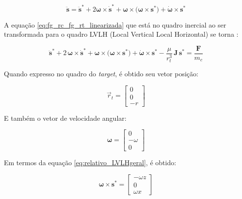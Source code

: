 \begin{equation}
\label{eq:TransporteSymon1979}
\ddot{\mathbf s} = 
\ddot{\mathbf s}^{*}
+ 2\boldsymbol\omega\times\dot{\mathbf s}^{*}
+ \boldsymbol\omega\times\big(\boldsymbol\omega\times\mathbf s^{*}\big)
+ \dot{\boldsymbol\omega}\times\mathbf s^{*}
\end{equation}

A equação \eqref{eq:fg_rc_fg_rt_linearizada} que está no quadro inercial ao ser transformada para o quadro LVLH (Local Vertical Local Horizontal) se torna \cite{fehse2003}:

\begin{equation}
\label{eq:relativo_LVLHgeral}
\ddot{\mathbf s}^{*}
+ 2\,\boldsymbol\omega\times\dot{\mathbf s}^{*}
+ \boldsymbol\omega\times\big(\boldsymbol\omega\times\mathbf s^{*}\big)
+ \dot{\boldsymbol\omega}\times\mathbf s^{*}
- \frac{\mu}{r_t^3}\,\mathbf J\,\mathbf s^{*}
= \frac{\mathbf F}{m_c}
\end{equation}

Quando expresso no quadro do \emph{target}, é obtido seu vetor posição:

\begin{equation}
\label{eq:posicao_LVLH_target}
\vec r_t = \begin{bmatrix} 0 \\ 0 \\ -r \end{bmatrix}
\end{equation}

E também o vetor de velocidade angular:

\begin{equation}
\label{eq:velocidadeAngular_LVLH_target}
\boldsymbol\omega = \begin{bmatrix} 0 \\ -\omega \\ 0
\end{bmatrix}
\end{equation}

Em termos da equação \eqref{eq:relativo_LVLHgeral}, é obtido:

\begin{equation}
\label{eq:velAngular_cross_s}
\boldsymbol\omega \times \boldsymbol s^* =
\begin{bmatrix}
    -\omega z \\
    0         \\
    \omega x
\end{bmatrix} 
\end{equation}

